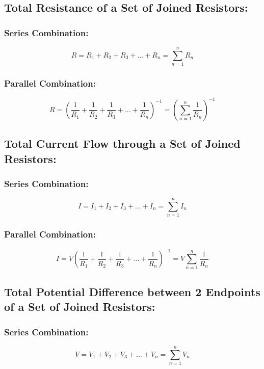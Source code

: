 \documentclass[a4paper]{report}
\begin{document}
        \subsection{Total Resistance of a Set of Joined Resistors:}
            \subsubsection{Series Combination:}
                \begin{equation}
                    R = R_1 + R_2 + R_3 + ... + R_n = \sum_{n = 1}^n R_n
                \end{equation}
            \subsubsection{Parallel Combination:}
                \begin{equation}
                    R = (\frac{1}{R_1} + \frac{1}{R_2} + \frac{1}{R_3} + ... + \frac{1}{R_n})^{-1} = (\sum_{n = 1}^{n} \frac{1}{R_n})^{-1}
                \end{equation}
        \subsection{Total Current Flow through a Set of Joined Resistors:}
            \subsubsection{Series Combination:}
                \begin{equation}
                    I = I_1 + I_2 + I_3 + ... + I_n = \sum_{n = 1}^n I_n
                \end{equation}
            \subsubsection{Parallel Combination:}
                \begin{equation}
                    I = V(\frac{1}{R_1} + \frac{1}{R_2} + \frac{1}{R_3} + ... + \frac{1}{R_n})^{-1} = V \sum_{n = 1}^{n} \frac{1}{R_n}
                \end{equation}
        \subsection{Total Potential Difference between 2 Endpoints of a Set of Joined Resistors:}
            \subsubsection{Series Combination:}
                \begin{equation}
                    V = V_1 + V_2 + V_3 + ... + V_n = \sum_{n = 1}^n V_n 
                \end{equation}
\end{document}
